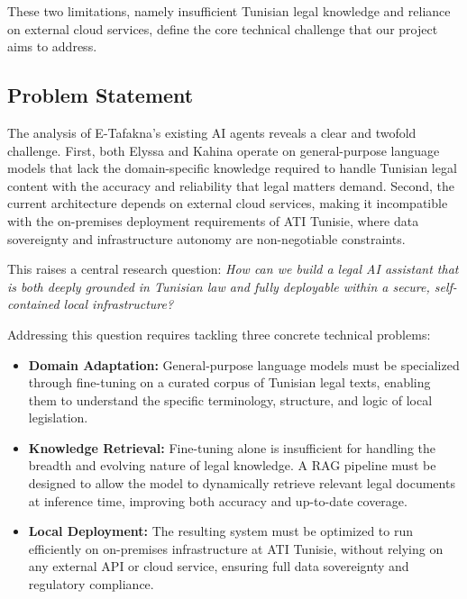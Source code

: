 These two limitations, namely insufficient Tunisian legal knowledge and reliance on external
cloud services, define the core technical challenge that our project aims to address.

\subsection{Problem Statement}

The analysis of E-Tafakna's existing \ac{AI} agents reveals a clear and twofold 
challenge. First, both Elyssa and Kahina operate on general-purpose language models 
that lack the domain-specific knowledge required to handle Tunisian legal content 
with the accuracy and reliability that legal matters demand. Second, the current 
architecture depends on external cloud services, making it incompatible with the 
on-premises deployment requirements of \ac{ATI} Tunisie, where data sovereignty 
and infrastructure autonomy are non-negotiable constraints.

This raises a central research question: \textit{How can we build a legal \ac{AI} 
assistant that is both deeply grounded in Tunisian law and fully deployable within 
a secure, self-contained local infrastructure?}

Addressing this question requires tackling three concrete technical problems:

\begin{itemize}
    \item \textbf{Domain Adaptation:} General-purpose language models must be 
    specialized through fine-tuning on a curated corpus of Tunisian legal texts, 
    enabling them to understand the specific terminology, structure, and logic of 
    local legislation.

    \item \textbf{Knowledge Retrieval:} Fine-tuning alone is insufficient for 
    handling the breadth and evolving nature of legal knowledge. A \ac{RAG} pipeline 
    must be designed to allow the model to dynamically retrieve relevant legal 
    documents at inference time, improving both accuracy and up-to-date coverage.

    \item \textbf{Local Deployment:} The resulting system must be optimized to run 
    efficiently on on-premises infrastructure at \ac{ATI} Tunisie, without relying 
    on any external \ac{API} or cloud service, ensuring full data sovereignty and 
    regulatory compliance.
\end{itemize}

